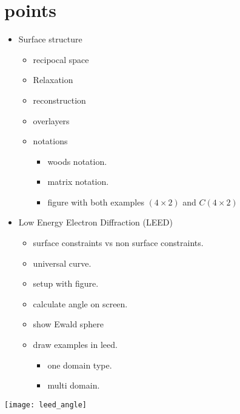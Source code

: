 \documentclass[article,a4paper,openleft]{memoir}
\begin{document}
\section{points}
\begin{itemize}
        \item Surface structure
        \begin{itemize}
                \item recipocal space
                \item Relaxation
                \item reconstruction
                \item overlayers
                \item notations
                        \begin{itemize}
                                \item woods notation.
                                \item matrix notation.
                                \item figure with both examples $(4\times2)$ and $C(4\times2)$
                        \end{itemize}
        \end{itemize}
        \item Low Energy Electron Diffraction (LEED)
                \begin{itemize}
                        \item surface constraints vs non surface constraints.
                        \item universal curve.
                        \item setup with figure.
                        \item calculate angle on screen.
                        \item show Ewald sphere
                        \item draw examples in leed.
                                \begin{itemize}
                                        \item one domain type.
                                        \item multi domain.
                                \end{itemize}
                \end{itemize}
\end{itemize}
\texttt{[image: leed\_angle]}
\end{document}

